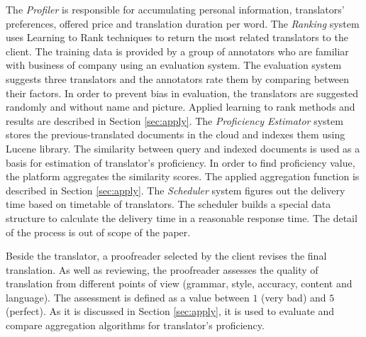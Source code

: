 The \textit{Profiler} is responsible for accumulating personal information, translators' preferences, offered price and translation duration per word. The \textit{Ranking} system uses Learning to Rank techniques to return the most related translators to the client. The training data is provided by a group of annotators who are familiar with business of company using an evaluation system. The evaluation system suggests three translators and the annotators rate them by comparing between their factors. In order to prevent bias in evaluation, the translators are suggested randomly and without name and picture. Applied learning to rank methods and results are described in Section \ref{sec:apply}. The \textit{Proficiency Estimator} system stores the previous-translated documents in the cloud and indexes them using Lucene library. The similarity between query and indexed documents is used as a basis for estimation of translator's proficiency. In order to find proficiency value, the platform aggregates the similarity scores. The applied aggregation function is described in Section \ref{sec:apply}. The \textit{Scheduler} system figures out the delivery time based on timetable of translators. The scheduler builds a special data structure to calculate the delivery time in a reasonable response time. The detail of the process is out of scope of the paper.

Beside the translator, a proofreader selected by the client revises the final translation. As well as reviewing, the proofreader assesses the quality of translation from different points of view (grammar, style, accuracy, content and language). The assessment is defined as a value between $1$ (very bad) and $5$ (perfect). As it is discussed in Section \ref{sec:apply}, it is used to evaluate and compare aggregation algorithms for translator's proficiency.

